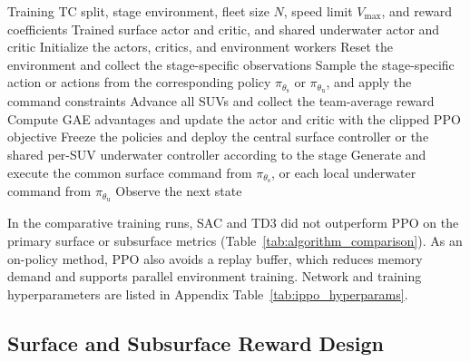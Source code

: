 \documentclass[a4paper,fleqn]{cas-dc}
\begin{document}
\begin{algorithm*}[t]
\caption{Training and deployment of the centralized surface and
shared-parameter subsurface policies}
\label{alg:ippo_training}
\begin{algorithmic}[1]
\REQUIRE Training TC split, stage environment, fleet size \(N\), speed limit
\(V_{\max}\), and reward coefficients
\ENSURE Trained surface actor and critic, and shared underwater actor and critic
\STATE Initialize the actors, critics, and environment workers
  \STATE Reset the environment and collect the stage-specific observations
    \STATE Sample the stage-specific action or actions from the corresponding
    policy \(\pi_{\theta_{\mathrm{s}}}\) or \(\pi_{\theta_{\mathrm{u}}}\), and
    apply the command constraints
    \STATE Advance all SUVs and collect the team-average reward
  \ENDFOR
  \STATE Compute GAE advantages and update the actor and critic with the
  clipped PPO objective
\ENDFOR
\STATE Freeze the policies and deploy the central surface controller or the
shared per-SUV underwater controller according to the stage
  \STATE Generate and execute the common surface command from
  \(\pi_{\theta_{\mathrm{s}}}\), or each local underwater command from
  \(\pi_{\theta_{\mathrm{u}}}\)
  \STATE Observe the next state
\ENDFOR
\end{algorithmic}
\end{algorithm*}

In the comparative training runs, SAC and TD3 did not outperform PPO on the
primary surface or subsurface metrics (Table~\ref{tab:algorithm_comparison}).
As an on-policy method, PPO also avoids a replay buffer, which reduces memory
demand and supports parallel environment training. Network and training
hyperparameters are listed in Appendix Table~\ref{tab:ippo_hyperparams}.



\subsection{Surface and Subsurface Reward Design}
\end{document}

